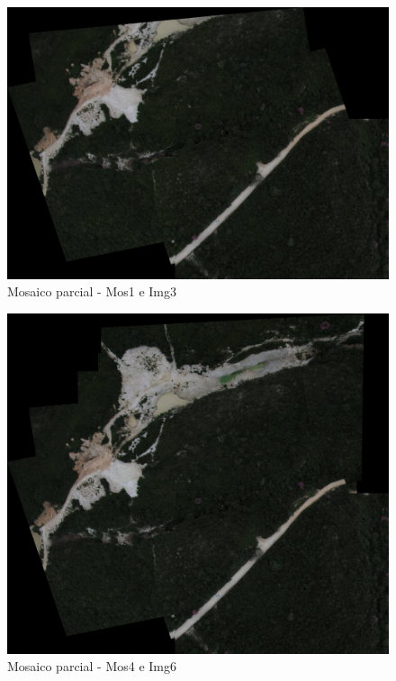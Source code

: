\documentclass[9pt, a4paper, nofonttune, journal]{IEEEtran}
\begin{document}
\begin{figure}[!h]
\begin{center}
\includegraphics[scale=0.25]{figuras/Mosaic2}
\caption{Mosaico parcial - Mos1 e Img3 }
\label{fig:mosaico}
\end{center}
\end{figure}

\begin{figure}[!h]
\begin{center}
\includegraphics[scale=0.25]{figuras/Mosaic5}
\caption{Mosaico parcial - Mos4 e Img6}
\label{fig:mosaico}
\end{center}
\end{figure}
\end{document}
